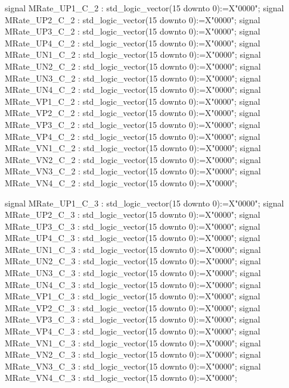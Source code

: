 \begin{mylisting}[language=VHDL,caption=ゲート信号出力モジュール,label=MMC_PWM_GEN_module_VHDL]
	signal 	MRate_UP1_C_2					: std_logic_vector(15 downto 0):=X"0000";
	signal 	MRate_UP2_C_2					: std_logic_vector(15 downto 0):=X"0000";
	signal 	MRate_UP3_C_2					: std_logic_vector(15 downto 0):=X"0000";
	signal 	MRate_UP4_C_2					: std_logic_vector(15 downto 0):=X"0000";
	signal 	MRate_UN1_C_2					: std_logic_vector(15 downto 0):=X"0000";
	signal 	MRate_UN2_C_2					: std_logic_vector(15 downto 0):=X"0000";
	signal 	MRate_UN3_C_2					: std_logic_vector(15 downto 0):=X"0000";
	signal 	MRate_UN4_C_2					: std_logic_vector(15 downto 0):=X"0000";
	signal 	MRate_VP1_C_2					: std_logic_vector(15 downto 0):=X"0000";
	signal 	MRate_VP2_C_2					: std_logic_vector(15 downto 0):=X"0000";
	signal 	MRate_VP3_C_2					: std_logic_vector(15 downto 0):=X"0000";
	signal 	MRate_VP4_C_2					: std_logic_vector(15 downto 0):=X"0000";
	signal 	MRate_VN1_C_2					: std_logic_vector(15 downto 0):=X"0000";
	signal 	MRate_VN2_C_2					: std_logic_vector(15 downto 0):=X"0000";
	signal 	MRate_VN3_C_2					: std_logic_vector(15 downto 0):=X"0000";
	signal 	MRate_VN4_C_2					: std_logic_vector(15 downto 0):=X"0000";

	signal 	MRate_UP1_C_3					: std_logic_vector(15 downto 0):=X"0000";
	signal 	MRate_UP2_C_3					: std_logic_vector(15 downto 0):=X"0000";
	signal 	MRate_UP3_C_3					: std_logic_vector(15 downto 0):=X"0000";
	signal 	MRate_UP4_C_3					: std_logic_vector(15 downto 0):=X"0000";
	signal 	MRate_UN1_C_3					: std_logic_vector(15 downto 0):=X"0000";
	signal 	MRate_UN2_C_3					: std_logic_vector(15 downto 0):=X"0000";
	signal 	MRate_UN3_C_3					: std_logic_vector(15 downto 0):=X"0000";
	signal 	MRate_UN4_C_3					: std_logic_vector(15 downto 0):=X"0000";
	signal 	MRate_VP1_C_3					: std_logic_vector(15 downto 0):=X"0000";
	signal 	MRate_VP2_C_3					: std_logic_vector(15 downto 0):=X"0000";
	signal 	MRate_VP3_C_3					: std_logic_vector(15 downto 0):=X"0000";
	signal 	MRate_VP4_C_3					: std_logic_vector(15 downto 0):=X"0000";
	signal 	MRate_VN1_C_3					: std_logic_vector(15 downto 0):=X"0000";
	signal 	MRate_VN2_C_3					: std_logic_vector(15 downto 0):=X"0000";
	signal 	MRate_VN3_C_3					: std_logic_vector(15 downto 0):=X"0000";
	signal 	MRate_VN4_C_3					: std_logic_vector(15 downto 0):=X"0000";


\end{mylisting}
